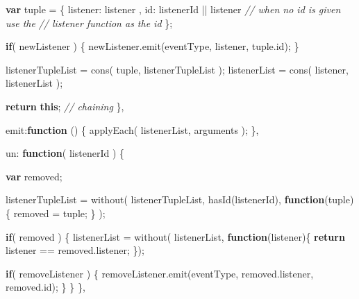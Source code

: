 \documentclass[12pt, ]{article}
\newenvironment{Shaded}{}{}
\newcommand{\KeywordTok}[1]{\textcolor[rgb]{0.00,0.44,0.13}{\textbf{{#1}}}}
\newcommand{\DataTypeTok}[1]{\textcolor[rgb]{0.56,0.13,0.00}{{#1}}}
\newcommand{\CommentTok}[1]{\textcolor[rgb]{0.38,0.63,0.69}{\textit{{#1}}}}
\newcommand{\OtherTok}[1]{\textcolor[rgb]{0.00,0.44,0.13}{{#1}}}
\newcommand{\FunctionTok}[1]{\textcolor[rgb]{0.02,0.16,0.49}{{#1}}}
\newcommand{\NormalTok}[1]{{#1}}
\begin{document}
\begin{Shaded}
\begin{Highlighting}[]
         \KeywordTok{var} \NormalTok{tuple = \{}
            \DataTypeTok{listener}\NormalTok{: listener}
         \NormalTok{,  }\DataTypeTok{id}\NormalTok{:       listenerId || listener }\CommentTok{// when no id is given use the}
                                             \CommentTok{// listener function as the id}
         \NormalTok{\};}

         \KeywordTok{if}\NormalTok{( newListener ) \{}
            \OtherTok{newListener}\NormalTok{.}\FunctionTok{emit}\NormalTok{(eventType, listener, }\OtherTok{tuple}\NormalTok{.}\FunctionTok{id}\NormalTok{);}
         \NormalTok{\}}
         
         \NormalTok{listenerTupleList = }\FunctionTok{cons}\NormalTok{( tuple,    listenerTupleList );}
         \NormalTok{listenerList      = }\FunctionTok{cons}\NormalTok{( listener, listenerList      );}

         \KeywordTok{return} \KeywordTok{this}\NormalTok{; }\CommentTok{// chaining}
      \NormalTok{\},}
     
      \DataTypeTok{emit}\NormalTok{:}\KeywordTok{function} \NormalTok{() \{                                                                                           }
         \FunctionTok{applyEach}\NormalTok{( listenerList, arguments );}
      \NormalTok{\},}
      
      \DataTypeTok{un}\NormalTok{: }\KeywordTok{function}\NormalTok{( listenerId ) \{}
             
         \KeywordTok{var} \NormalTok{removed;             }
              
         \NormalTok{listenerTupleList = }\FunctionTok{without}\NormalTok{(}
            \NormalTok{listenerTupleList,}
            \FunctionTok{hasId}\NormalTok{(listenerId),}
            \KeywordTok{function}\NormalTok{(tuple)\{}
               \NormalTok{removed = tuple;}
            \NormalTok{\}}
         \NormalTok{);    }
         
         \KeywordTok{if}\NormalTok{( removed ) \{}
            \NormalTok{listenerList = }\FunctionTok{without}\NormalTok{( listenerList, }\KeywordTok{function}\NormalTok{(listener)\{}
               \KeywordTok{return} \NormalTok{listener == }\OtherTok{removed}\NormalTok{.}\FunctionTok{listener}\NormalTok{;}
            \NormalTok{\});}
         
            \KeywordTok{if}\NormalTok{( removeListener ) \{}
               \OtherTok{removeListener}\NormalTok{.}\FunctionTok{emit}\NormalTok{(eventType, }\OtherTok{removed}\NormalTok{.}\FunctionTok{listener}\NormalTok{, }\OtherTok{removed}\NormalTok{.}\FunctionTok{id}\NormalTok{);}
            \NormalTok{\}}
         \NormalTok{\}}
      \NormalTok{\},}
      

\end{Highlighting}
\end{Shaded}
\end{document}
